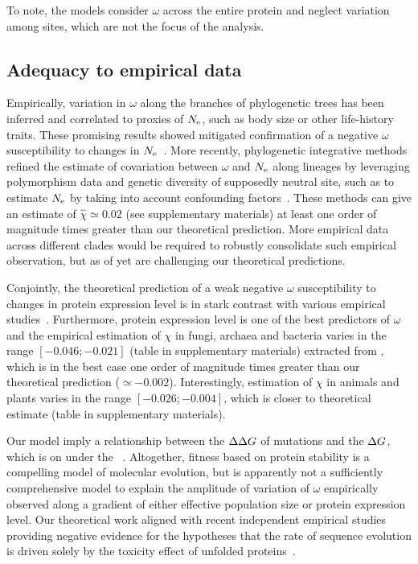 To note, the models consider $\omega$ across the entire protein and neglect variation among sites, which are not the focus of the analysis.

\subsection{Adequacy to empirical data}
Empirically, variation in $\omega$ along the branches of phylogenetic trees has been inferred and correlated to proxies of $N_{\mathrm{e}}$, such as body size or other life-history traits.
These promising results showed mitigated confirmation of a negative $\omega$ susceptibility to changes in $N_{\mathrm{e}}$~\citep{Lanfear2014}.
More recently, phylogenetic integrative methods refined the estimate of covariation between $\omega$ and $N_{\mathrm{e}}$ along lineages by leveraging polymorphism data and genetic diversity of supposedly neutral site, such as to estimate $N_{\mathrm{e}}$ by taking into account confounding factors~\citep{Brevet2019}.
These methods can give an estimate of $\hat{\chi} \simeq 0.02$ (see supplementary materials) at least one order of magnitude times greater than our theoretical prediction.
More empirical data across different clades would be required to robustly consolidate such empirical observation, but as of yet are challenging our theoretical predictions.

Conjointly, the theoretical prediction of a weak negative $\omega$ susceptibility to changes in protein expression level is in stark contrast with various empirical studies~\citep{Duret2000, Rocha2004, Wang2011, Song2017}.
Furthermore, protein expression level is one of the best predictors of $\omega$ and the empirical estimation of $\chi$ in fungi, archaea and bacteria varies in the range $[-0.046;-0.021]$ (table in supplementary materials) extracted from \citet{Zhang2015}, which is in the best case one order of magnitude times greater than our theoretical prediction ($\simeq -0.002$).
Interestingly, estimation of $\chi$ in animals and plants varies in the range $[-0.026;-0.004]$, which is closer to theoretical estimate (table in supplementary materials).

Our model imply a relationship between the $\Delta \Delta G$ of mutations and the $\Delta G$, which is on under the ~\citep{Serohijos2012}.
Altogether, fitness based on protein stability is a compelling model of molecular evolution, but is apparently not a sufficiently comprehensive model to explain the amplitude of variation of $\omega$ empirically observed along a gradient of either effective population size or protein expression level.
Our theoretical work aligned with recent independent empirical studies providing negative evidence for the hypotheses that the rate of sequence evolution is driven solely by the toxicity effect of unfolded proteins~\citep{Plata2017,Razban2019,Biesiadecka2020}.

